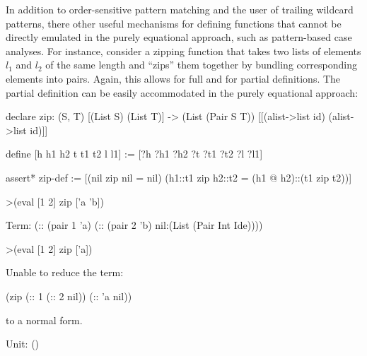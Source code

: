 In addition to order-sensitive pattern matching and the user of trailing wildcard patterns, 
there other useful mechanisms for defining functions that cannot be directly emulated in the purely equational approach,
such as pattern-based case analyses. For instance, consider a zipping function that takes two lists of elements $l_1$
and $l_2$ of the same length and ``zips'' them together by bundling corresponding elements into pairs. Again, this allows
for full and for partial definitions. The partial definition can be easily accommodated in the purely equational approach:
\begin{tcAthena}
declare zip: (S, T) [(List S) (List T)] -> (List (Pair S T))
                           [[(alist->list id) (alist->list id)]]

define [h h1 h2 t t1 t2 l l1] := [?h ?h1 ?h2 ?t ?t1 ?t2 ?l ?l1]

assert* zip-def := [(nil zip nil = nil)
                    (h1::t1 zip h2::t2 = (h1 @ h2)::(t1 zip t2))]

>(eval [1 2] zip ['a 'b])

Term: (:: (pair 1 'a)
          (:: (pair 2 'b)
              nil:(List (Pair Int Ide))))

>(eval [1 2] zip ['a])

Unable to reduce the term:
 
(zip (:: 1
         (:: 2
             nil))
     (:: 'a
         nil))
 
to a normal form.

Unit: ()
\end{tcAthena}

